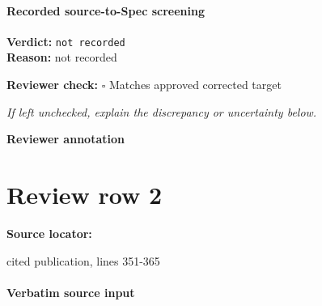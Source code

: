 \documentclass[10pt]{article}
\newcommand{\reviewerbox}{%
  \par\noindent\fbox{\parbox{0.96\linewidth}{\rule{0pt}{0.38in}}}\par
}
\newcommand{\reviewmatch}[1]{%
  \par\noindent\textbf{Reviewer check:} $\square$\; #1\par
  \noindent\emph{If left unchecked, explain the discrepancy or uncertainty below.}\par
}
\begin{document}
\paragraph{Recorded source-to-Spec screening}
\textbf{Verdict:} \texttt{not recorded}
\\
\textbf{Reason:} not recorded
\reviewmatch{Matches approved corrected target}
\noindent\textbf{Reviewer annotation}\par
\reviewerbox
\clearpage
\hypertarget{source-claim-8765a3b8d5c11957}{}
\section*{Review row 2}
\textbf{Source locator:} {\footnotesize\raggedright cited publication, lines 351-\allowbreak{}365\par}
\paragraph{Verbatim source input}
\begin{ReviewVerbatim}
\end{ReviewVerbatim}
\end{document}
